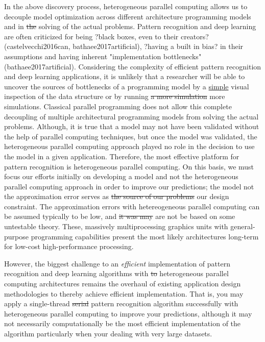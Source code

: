 \documentclass[10pt]{article}[draft]
\begin{document}
In the above discovery process, heterogeneous parallel computing allows us to decouple model optimization across different architecture programming models and  in \st{the} solving of the actual problems. Pattern recognition and deep learning are often criticized for being  ?black boxes, even to their creators? (castelvecchi2016can, bathaee2017artificial), ?having a built in bias? in their assumptions and having inherent "implementation bottlenecks" (bathaee2017artificial). Considering the complexity of efficient pattern recognition and deep learning applications, it is unlikely that a researcher will be able to uncover the sources of bottlenecks of a programming model by a \underline{simple} visual inspection of the data structure  or by running \st{a more simulation} more simulations. Classical parallel programming does not allow this complete decoupling of multiple architectural programming models from  solving the actual problems. Although, it is true that a model may not have been validated without the help of parallel computing techniques, but once the model was validated, the heterogeneous parallel computing approach  played no role in the decision to use the model in a given application. Therefore, the most effective platform for pattern recognition is  heterogeneous parallel computing. On this basis, we must focus our efforts initially on developing a model and not the heterogeneous parallel computing approach in order to improve our  predictions; the model not the approximation error  serves as \st{the source of our problems } our design constraint. The approximation errors with hetereogeneous parallel computing can be assumed typically to be low, and \st{it was may} are not be based on some untestable theory. These, massively multiprocessing graphics units with general-purpose programming capabilities present the most likely architectures long-term for low-cost high-performance processing. 

However, the biggest challenge to an \emph{efficient} implementation of pattern recognition and deep learning algorithms with \st{to} heterogeneous parallel computing architectures remains the overhaul of existing application design methodologies to thereby achieve  efficient implementation. That is, you may apply a single-thread \st{serial} pattern recognition algorithm successfully with  heterogeneous parallel computing to improve your predictions, although it may not {necessarily} computationally be the most efficient implementation  of the algorithm particularly when your dealing with very large datasets. 
\end{document}
